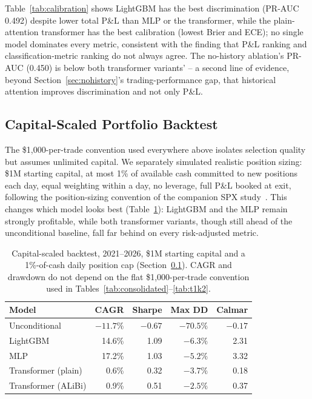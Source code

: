 \documentclass[sigconf,review,anonymous]{acmart}
\begin{document}
Table~\ref{tab:calibration} shows LightGBM has the best discrimination (PR-AUC 0.492) despite lower total P\&L than MLP or the transformer, while the plain-attention transformer has the best calibration (lowest Brier and ECE); no single model dominates every metric, consistent with the finding that P\&L ranking and classification-metric ranking do not always agree. The no-history ablation's PR-AUC (0.450) is below both transformer variants' -- a second line of evidence, beyond Section~\ref{sec:nohistory}'s trading-performance gap, that historical attention improves discrimination and not only P\&L.

\subsection{Capital-Scaled Portfolio Backtest}
\label{sec:capitalscaled}
The \$1,000-per-trade convention used everywhere above isolates selection quality but assumes unlimited capital. We separately simulated realistic position sizing: \$1M starting capital, at most 1\% of available cash committed to new positions each day, equal weighting within a day, no leverage, full P\&L booked at exit, following the position-sizing convention of the companion SPX study~\cite{glasserman2025tp2}. This changes which model looks best (Table~\ref{tab:capitalscaled}): LightGBM and the MLP remain strongly profitable, while both transformer variants, though still ahead of the unconditional baseline, fall far behind on every risk-adjusted metric.

\begin{table}[t]
\centering
\footnotesize
\begin{tabular}{lrrrr}
\toprule
Model & CAGR & Sharpe & Max DD & Calmar \\
\midrule
Unconditional & $-11.7\%$ & $-0.67$ & $-70.5\%$ & $-0.17$ \\
LightGBM & 14.6\% & 1.09 & $-6.3\%$ & 2.31 \\
MLP & 17.2\% & 1.03 & $-5.2\%$ & 3.32 \\
Transformer (plain) & 0.6\% & 0.32 & $-3.7\%$ & 0.18 \\
Transformer (ALiBi) & 0.9\% & 0.51 & $-2.5\%$ & 0.37 \\
\bottomrule
\end{tabular}
\caption{Capital-scaled backtest, 2021--2026, \$1M starting capital and a 1\%-of-cash daily position cap (Section~\ref{sec:capitalscaled}). CAGR and drawdown do not depend on the flat \$1,000-per-trade convention used in Tables~\ref{tab:consolidated}--\ref{tab:t1k2}.}
\label{tab:capitalscaled}
\end{table}
\end{document}
